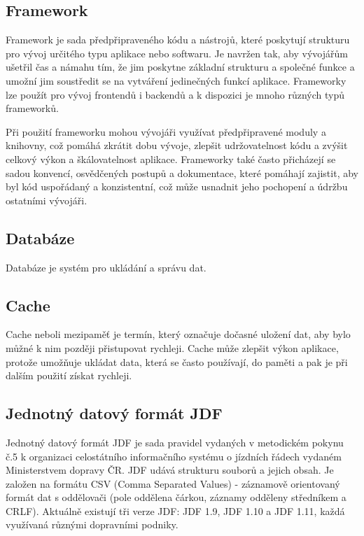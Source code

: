 \subsection{Framework}
Framework je sada předpřipraveného kódu a nástrojů, které poskytují strukturu pro vývoj určitého typu aplikace nebo softwaru. Je navržen tak, aby vývojářům ušetřil čas a námahu tím, že jim poskytne základní strukturu a společné funkce a umožní jim soustředit se na vytváření jedinečných funkcí aplikace. Frameworky lze použít pro vývoj frontendů i backendů a k dispozici je mnoho různých typů frameworků. \par
Při použití frameworku mohou vývojáři využívat předpřipravené moduly a knihovny, což pomáhá zkrátit dobu vývoje, zlepšit udržovatelnost kódu a zvýšit celkový výkon a škálovatelnost aplikace. Frameworky také často přicházejí se sadou konvencí, osvědčených postupů a dokumentace, které pomáhají zajistit, aby byl kód uspořádaný a konzistentní, což může usnadnit jeho pochopení a údržbu ostatními vývojáři.
\subsection{Databáze}
Databáze je systém pro ukládání a správu dat.
\subsection{Cache}
Cache neboli mezipaměť je termín, který označuje dočasné uložení dat, aby bylo můžné k nim později přistupovat rychleji. Cache může zlepšit výkon aplikace, protože umožňuje ukládat data, která se často používají, do paměti a pak je při dalším použití získat rychleji. \par
\subsection[JDF]{Jednotný datový formát JDF}\label{JDF}
Jednotný datový formát JDF je sada pravidel vydaných v metodickém pokynu č.5 k organizaci celostátního informačního systému o jízdních řádech vydaném Ministerstvem dopravy ČR. JDF udává strukturu souborů a jejich obsah. Je založen na formátu CSV (Comma Separated Values) - záznamově orientovaný formát dat s oddělovači (pole oddělena čárkou, záznamy odděleny středníkem a CRLF). Aktuálně existují tři verze JDF: JDF 1.9, JDF 1.10 a JDF 1.11, každá využívaná různými dopravními podniky. \par